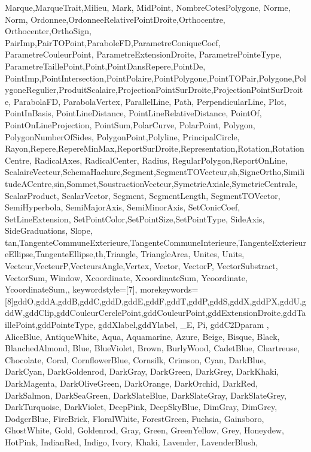 {{  Marque,MarqueTrait,Milieu,
  Mark, MidPoint,
  NombreCotesPolygone,
  Norme,
  Norm,
  Ordonnee,OrdonneeRelativePointDroite,Orthocentre,
  Orthocenter,OrthoSign,
  PairImp,PairTOPoint,ParaboleFD,ParametreConiqueCoef, 
    ParametreCouleurPoint, 
    ParametreExtensionDroite,  
    ParametrePointeType, 
    ParametreTaillePoint,Point,PointDansRepere,PointDe,
    PointImp,PointIntersection,PointPolaire,PointPolygone,PointTOPair,Polygone,PolygoneRegulier,ProduitScalaire,ProjectionPointSurDroite,ProjectionPointSurDroite,
    ParabolaFD, ParabolaVertex, ParallelLine, Path,  PerpendicularLine,
    Plot, PointInBasis, PointLineDistance, PointLineRelativeDistance, PointOf, PointOnLineProjection, PointSum,PolarCurve, PolarPoint, Polygon, PolygonNumberOfSides, PolygonPoint,Polyline, PrincipalCircle,
    Rayon,Repere,RepereMinMax,ReportSurDroite,Representation,Rotation,RotationCentre,
  RadicalAxes, RadicalCenter, Radius, RegularPolygon,ReportOnLine,
    ScalaireVecteur,SchemaHachure,Segment,SegmentTOVecteur,sh,SigneOrtho,SimilitudeACentre,sin,Sommet,SoustractionVecteur,SymetrieAxiale,SymetrieCentrale,
  ScalarProduct, ScalarVector, Segment, SegmentLength, SegmentTOVector, SemiHyperbola, SemiMajorAxis, SemiMinorAxis, SetConicCoef, SetLineExtension, SetPointColor,SetPointSize,SetPointType, SideAxis, SideGraduations, Slope,
    tan,TangenteCommuneExterieure,TangenteCommuneInterieure,TangenteExterieureEllipse,TangenteEllipse,th,Triangle,
  TriangleArea,
  Unites,
  Units,
  Vecteur,VecteurP,VecteursAngle,Vertex,
  Vector, 
VectorP, 
VectorSubstract, 
VectorSum,
Window, Xcoordinate, XcoordinateSum, Ycoordinate, YcoordinateSum,},
  keywordstyle=[7]\color{FireBrick},
  morekeywords=[8]{gddO,gddA,gddB,gddC,gddD,gddE,gddF,gddT,gddP,gddS,gddX,gddPX,gddU,gddW,gddClip,gddCouleurCerclePoint,gddCouleurPoint,gddExtensionDroite,gddTaillePoint,gddPointeType,
  gddXlabel,gddYlabel, _E, Pi, gddC2Dparam ,
  AliceBlue,
AntiqueWhite,
Aqua,
Aquamarine,
Azure,
Beige,
Bisque,
Black,
BlanchedAlmond,
Blue,
BlueViolet,
Brown,
BurlyWood,
CadetBlue,
Chartreuse,
Chocolate,
Coral,
CornflowerBlue,
Cornsilk,
Crimson,
Cyan,
DarkBlue,
DarkCyan,
DarkGoldenrod,
DarkGray,
DarkGreen,
DarkGrey,
DarkKhaki,
DarkMagenta,
DarkOliveGreen,
DarkOrange,
DarkOrchid,
DarkRed,
DarkSalmon,
DarkSeaGreen,
DarkSlateBlue,
DarkSlateGray,
DarkSlateGrey,
DarkTurquoise,
DarkViolet,
DeepPink,
DeepSkyBlue,
DimGray,
DimGrey,
DodgerBlue,
FireBrick,
FloralWhite,
ForestGreen,
Fuchsia,
Gainsboro,
GhostWhite,
Gold,
Goldenrod,
Gray,
Green,
GreenYellow,
Grey,
Honeydew,
HotPink,
IndianRed,
Indigo,
Ivory,
Khaki,
Lavender,
LavenderBlush,
}}
